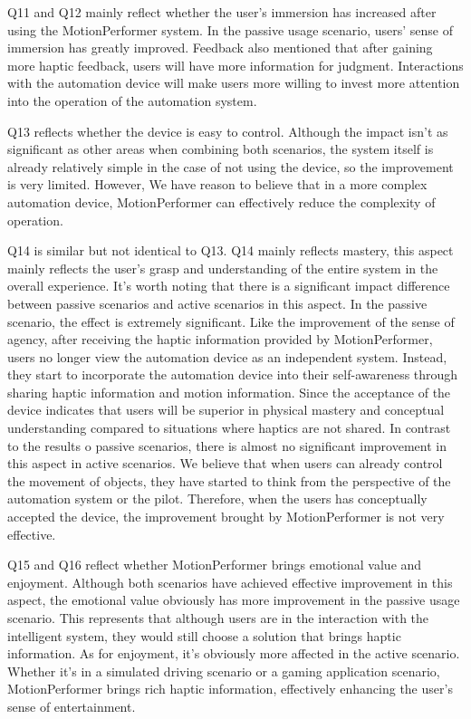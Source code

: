 Q11 and Q12 mainly reflect whether the user's immersion has increased after using the MotionPerformer system. In the passive usage scenario, users' sense of immersion has greatly improved. Feedback also mentioned that after gaining more haptic feedback, users will have more information for judgment. Interactions with the automation device will make users more willing to invest more attention into the operation of the automation system.

Q13 reflects whether the device is easy to control. Although the impact isn't as significant as other areas when combining both scenarios, the system itself is already relatively simple in the case of not using the device, so the improvement is very limited. However, We have reason to believe that in a more complex automation device, MotionPerformer can effectively reduce the complexity of operation.

Q14 is similar but not identical to Q13. Q14 mainly reflects mastery, this aspect mainly reflects the user's grasp and understanding of the entire system in the overall experience. It's worth noting that there is a significant impact difference between passive scenarios and active scenarios in this aspect. In the passive scenario, the effect is extremely significant. Like the improvement of the sense of agency, after receiving the haptic information provided by MotionPerformer, users no longer view the automation device as an independent system. Instead, they start to incorporate the automation device into their self-awareness through sharing haptic information and motion information. Since the acceptance of the device indicates that users will be superior in physical mastery and conceptual understanding compared to situations where haptics are not shared. In contrast to the results o passive scenarios, there is almost no significant improvement in this aspect in active scenarios. We believe that when users can already control the movement of objects, they have started to think from the perspective of the automation system or the pilot. Therefore, when the users has conceptually accepted the device, the improvement brought by MotionPerformer is not very effective.

Q15 and Q16 reflect whether MotionPerformer brings emotional value and enjoyment. Although both scenarios have achieved effective improvement in this aspect, the emotional value obviously has more improvement in the passive usage scenario. This represents that although users are in the interaction with the intelligent system, they would still choose a solution that brings haptic information. As for enjoyment, it's obviously more affected in the active scenario. Whether it's in a simulated driving scenario or a gaming application scenario, MotionPerformer brings rich haptic information, effectively enhancing the user's sense of entertainment.

